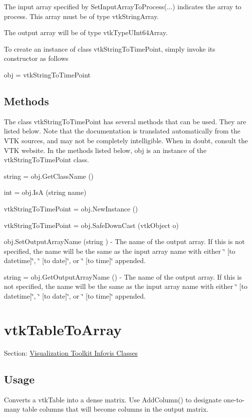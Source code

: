 The input array specified by Set\-Input\-Array\-To\-Process(...) indicates the array to process. This array must be of type vtk\-String\-Array.

The output array will be of type vtk\-Type\-U\-Int64\-Array.

To create an instance of class vtk\-String\-To\-Time\-Point, simply invoke its constructor as follows \begin{DoxyVerb}  obj = vtkStringToTimePoint
\end{DoxyVerb}
 \hypertarget{vtkwidgets_vtkxyplotwidget_Methods}{}\subsection{Methods}\label{vtkwidgets_vtkxyplotwidget_Methods}
The class vtk\-String\-To\-Time\-Point has several methods that can be used. They are listed below. Note that the documentation is translated automatically from the V\-T\-K sources, and may not be completely intelligible. When in doubt, consult the V\-T\-K website. In the methods listed below, {\ttfamily obj} is an instance of the vtk\-String\-To\-Time\-Point class. 
\begin{DoxyItemize}
\item {\ttfamily string = obj.\-Get\-Class\-Name ()}  
\item {\ttfamily int = obj.\-Is\-A (string name)}  
\item {\ttfamily vtk\-String\-To\-Time\-Point = obj.\-New\-Instance ()}  
\item {\ttfamily vtk\-String\-To\-Time\-Point = obj.\-Safe\-Down\-Cast (vtk\-Object o)}  
\item {\ttfamily obj.\-Set\-Output\-Array\-Name (string )} -\/ The name of the output array. If this is not specified, the name will be the same as the input array name with either \char`\"{} \mbox{[}to datetime\mbox{]}\char`\"{}, \char`\"{} \mbox{[}to date\mbox{]}\char`\"{}, or \char`\"{} \mbox{[}to time\mbox{]}\char`\"{} appended.  
\item {\ttfamily string = obj.\-Get\-Output\-Array\-Name ()} -\/ The name of the output array. If this is not specified, the name will be the same as the input array name with either \char`\"{} \mbox{[}to datetime\mbox{]}\char`\"{}, \char`\"{} \mbox{[}to date\mbox{]}\char`\"{}, or \char`\"{} \mbox{[}to time\mbox{]}\char`\"{} appended.  
\end{DoxyItemize}\hypertarget{vtkinfovis_vtktabletoarray}{}\section{vtk\-Table\-To\-Array}\label{vtkinfovis_vtktabletoarray}
Section\-: \hyperlink{sec_vtkinfovis}{Visualization Toolkit Infovis Classes} \hypertarget{vtkwidgets_vtkxyplotwidget_Usage}{}\subsection{Usage}\label{vtkwidgets_vtkxyplotwidget_Usage}
Converts a vtk\-Table into a dense matrix. Use Add\-Column() to designate one-\/to-\/many table columns that will become columns in the output matrix.

